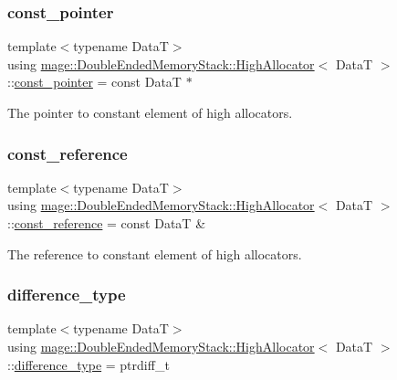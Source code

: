 \subsubsection{\texorpdfstring{const\+\_\+pointer}{const\_pointer}}
{\footnotesize\ttfamily template$<$typename DataT$>$ \\
using \hyperlink{structmage_1_1_double_ended_memory_stack_1_1_high_allocator}{mage\+::\+Double\+Ended\+Memory\+Stack\+::\+High\+Allocator}$<$ DataT $>$\+::\hyperlink{structmage_1_1_double_ended_memory_stack_1_1_high_allocator_ab0d52e1c59565e79f3bd5f0f02e65966}{const\+\_\+pointer} =  const DataT $\ast$}

The pointer to constant element of high allocators. \hypertarget{structmage_1_1_double_ended_memory_stack_1_1_high_allocator_a7f30fe90c403660a55f0ac05891f7ec1}{}\label{structmage_1_1_double_ended_memory_stack_1_1_high_allocator_a7f30fe90c403660a55f0ac05891f7ec1} 
\subsubsection{\texorpdfstring{const\+\_\+reference}{const\_reference}}
{\footnotesize\ttfamily template$<$typename DataT$>$ \\
using \hyperlink{structmage_1_1_double_ended_memory_stack_1_1_high_allocator}{mage\+::\+Double\+Ended\+Memory\+Stack\+::\+High\+Allocator}$<$ DataT $>$\+::\hyperlink{structmage_1_1_double_ended_memory_stack_1_1_high_allocator_a7f30fe90c403660a55f0ac05891f7ec1}{const\+\_\+reference} =  const DataT \&}

The reference to constant element of high allocators. \hypertarget{structmage_1_1_double_ended_memory_stack_1_1_high_allocator_a7b3fd8c4d6000165eac95eca43b28a66}{}\label{structmage_1_1_double_ended_memory_stack_1_1_high_allocator_a7b3fd8c4d6000165eac95eca43b28a66} 
\subsubsection{\texorpdfstring{difference\+\_\+type}{difference\_type}}
{\footnotesize\ttfamily template$<$typename DataT$>$ \\
using \hyperlink{structmage_1_1_double_ended_memory_stack_1_1_high_allocator}{mage\+::\+Double\+Ended\+Memory\+Stack\+::\+High\+Allocator}$<$ DataT $>$\+::\hyperlink{structmage_1_1_double_ended_memory_stack_1_1_high_allocator_a7b3fd8c4d6000165eac95eca43b28a66}{difference\+\_\+type} =  ptrdiff\+\_\+t}

